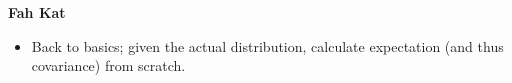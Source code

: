 \item \textbf{Fah Kat}
\begin{itemize}
\item Back to basics; given the actual distribution, calculate expectation (and thus covariance) from scratch.
\end{itemize}